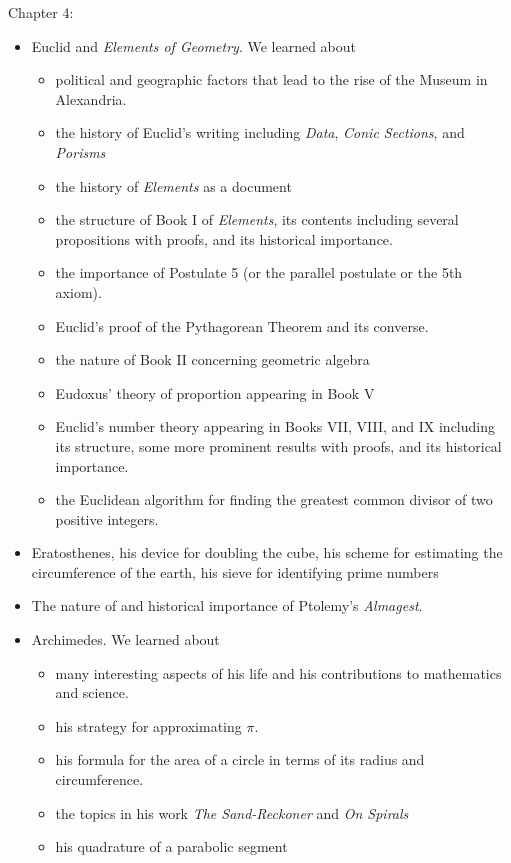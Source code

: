 \documentclass[11pt,fleqn]{article}
\begin{document}
Chapter 4:\\

\begin{itemize}
\item Euclid and \textit{Elements of Geometry}. We learned about
	\begin{itemize}
	\item political and geographic factors that lead to the rise of the Museum in Alexandria.
	\item the history of Euclid's writing including \textit{Data}, \textit{Conic Sections}, and \textit{Porisms}
	\item the history of \textit{Elements} as a document
	\item the structure of Book I of \textit{Elements}, its contents including several propositions with proofs, and its historical importance.
	\item the importance of Postulate 5 (or the parallel postulate or the 5th axiom).
	\item Euclid's proof of the Pythagorean Theorem and its converse.
	\item the nature of Book II concerning geometric algebra
	\item Eudoxus' theory of proportion appearing in Book V
	\item Euclid's number theory appearing in Books VII, VIII, and IX including its structure, some more prominent results with proofs, and its historical importance.
	\item the Euclidean algorithm for finding the greatest common divisor of two positive integers.
	\end{itemize}
\item Eratosthenes, his device for doubling the cube, his scheme for estimating the circumference of the earth, his sieve for identifying prime numbers
\item The nature of and historical importance of Ptolemy's \textit{Almagest}.
\item Archimedes. We learned about
	\begin{itemize}
	\item many interesting aspects of his life and his contributions to mathematics and science.
	\item his strategy for approximating $\pi$.
	\item his formula for the area of a circle in terms of its radius and circumference.
	\item the topics in his work \textit{The Sand-Reckoner} and \textit{On Spirals}
	\item his quadrature of a parabolic segment
	\end{itemize}
\end{itemize}
\end{document}
